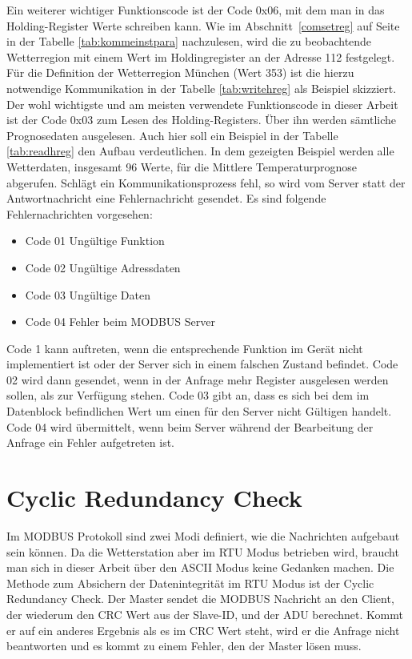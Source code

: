 Ein weiterer wichtiger Funktionscode ist der Code 0x06, mit dem man in das Holding-Register Werte schreiben kann. Wie im Abschnitt~\ref{comsetreg} auf Seite~\pageref{comsetreg} in der Tabelle \ref{tab:kommeinstpara} nachzulesen, wird die zu beobachtende Wetterregion mit einem Wert im Holdingregister an der Adresse 112 festgelegt. Für die Definition der Wetterregion München (Wert 353) ist die hierzu notwendige Kommunikation in der Tabelle \ref{tab:writehreg} als Beispiel skizziert. Der wohl wichtigste und am meisten verwendete Funktionscode in dieser Arbeit ist der Code 0x03 zum Lesen des Holding-Registers. Über ihn werden sämtliche Prognosedaten ausgelesen. Auch hier soll ein Beispiel in der Tabelle \ref{tab:readhreg} den Aufbau verdeutlichen. In dem gezeigten Beispiel werden alle Wetterdaten, insgesamt 96 Werte, für die Mittlere Temperaturprognose abgerufen. Schlägt ein Kommunikationsprozess fehl, so wird vom Server statt der Antwortnachricht eine Fehlernachricht gesendet. Es sind folgende Fehlernachrichten vorgesehen:
\begin{itemize}
\item Code 01 Ungültige Funktion
\item Code 02 Ungültige Adressdaten
\item Code 03 Ungültige Daten
\item Code 04 Fehler beim MODBUS Server
\end{itemize}
Code 1 kann auftreten, wenn die entsprechende Funktion im Gerät nicht implementiert ist oder der Server sich in einem falschen Zustand befindet. Code 02 wird dann gesendet, wenn in der Anfrage mehr Register ausgelesen werden sollen, als zur Verfügung stehen. Code 03 gibt an, dass es sich bei dem im Datenblock befindlichen Wert um einen für den Server nicht Gültigen handelt. Code 04 wird übermittelt, wenn beim Server während der Bearbeitung der Anfrage ein Fehler aufgetreten ist.    
\section{Cyclic Redundancy Check}
Im MODBUS Protokoll sind zwei Modi definiert, wie die Nachrichten aufgebaut sein können. Da die Wetterstation aber im RTU Modus betrieben wird, braucht man sich in dieser Arbeit über den ASCII Modus keine Gedanken machen. Die Methode zum Absichern der Datenintegrität im RTU Modus ist der Cyclic Redundancy Check. Der Master sendet die MODBUS Nachricht an den Client, der wiederum den CRC Wert aus der Slave-ID, und der ADU berechnet. Kommt er auf ein anderes Ergebnis als es im CRC Wert steht, wird er die Anfrage nicht beantworten und es kommt zu einem Fehler, den der Master lösen muss.\cite{modicon} 

